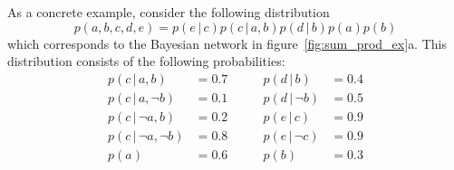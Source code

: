 \documentclass{article}
\newcommand{\giv}{\,|\,}
\begin{document}
\noindent As a concrete example, consider the following distribution
$$
    p(a, b, c, d, e) = p(e \giv c) p(c \giv a, b) p(d \giv b) p(a) p(b)
$$
which corresponds to the Bayesian network in figure~\ref{fig:sum_prod_ex}a. This distribution consists of the following probabilities:
\begin{align*}
    p(c \giv a, b) &= 0.7 \qquad& p(d \giv b) &= 0.4 \\
    p(c \giv a, \neg b) &= 0.1 \qquad& p(d \giv \neg b) &= 0.5 \\
    p(c \giv \neg a, b) &= 0.2 \qquad& p(e \giv c) &= 0.9 \\
    p(c \giv \neg a, \neg b) &= 0.8 \qquad& p(e \giv \neg c) &= 0.9 \\
    p(a) &= 0.6 \qquad & p(b) &= 0.3\\
\end{align*}
\end{document}
